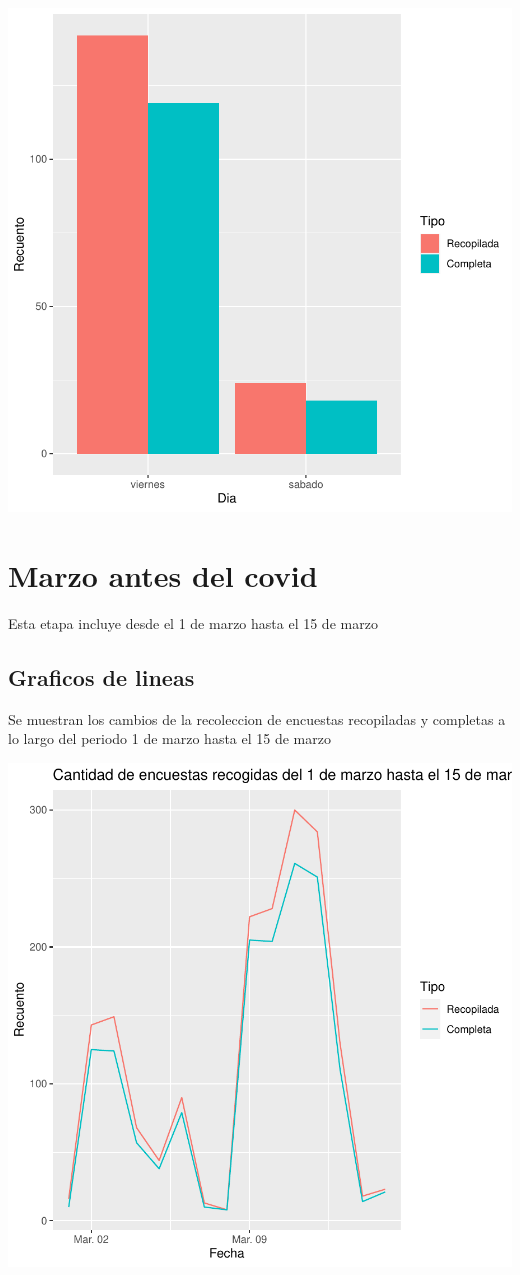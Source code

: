 \documentclass{article}
\begin{document}
\includegraphics{seguimento2-043}

\section{Marzo antes del covid}
Esta etapa incluye desde el 1 de marzo hasta el 15 de marzo

\subsection{Graficos de lineas}
Se muestran los cambios de la recoleccion de encuestas recopiladas y completas a lo largo del periodo 1 de marzo hasta el 15 de marzo

\includegraphics{seguimento2-044}
\end{document}
